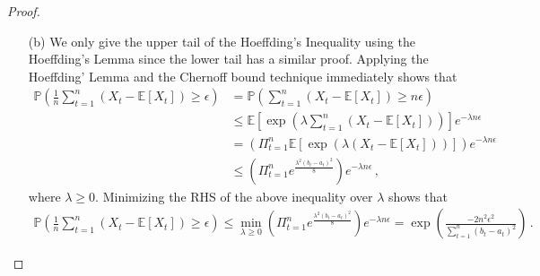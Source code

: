 \begin{proof}
\begin{enumerate}
	\item[(b)]  We only give the upper tail of the Hoeffding's Inequality using the Hoeffding's Lemma since the lower tail has a similar proof. Applying the Hoeffding' Lemma and the Chernoff bound technique immediately
	shows that
	\begin{align*}
		\mathbb{P}\left(\frac{1}{n}\sum^n_{t=1}(X_t -\mathbb{E}[X_t])\geq\epsilon\right)&=\mathbb{P}\left(\sum^n_{t=1}(X_t-\mathbb{E}[X_t])\geq n\epsilon \right)\\
		&\leq\mathbb{E}\left[\exp\left(\lambda\sum^n_{t=1}(X_t-\mathbb{E}[X_t]) \right) \right]e^{-\lambda n\epsilon}\\
		&=\left(\Pi^n_{t=1}\mathbb{E}[\exp\left(\lambda(X_t-\mathbb{E}[X_t])\right)] \right)e^{-\lambda n\epsilon}\\
		&\leq\left(\Pi^n_{t=1}e^{\frac{\lambda^2(b_t-a_t)^2}{8}} \right)e^{-\lambda n\epsilon}\,,
	\end{align*}
	where $\lambda\geq0$. Minimizing the RHS of the above inequality over $\lambda$ shows that
	\begin{align*}
		\mathbb{P}\left(\frac{1}{n}\sum^n_{t=1}(X_t -\mathbb{E}[X_t])\geq\epsilon\right)\leq \min_{\lambda\geq0}\left(\Pi^n_{t=1}e^{\frac{\lambda^2(b_t-a_t)^2}{8}} \right)e^{-\lambda n\epsilon} =\exp\left(\frac{-2n^2\epsilon^2}{\sum^n_{t=1}(b_t-a_t)^2}\right)\,.
	\end{align*}
\end{enumerate}
\end{proof}



